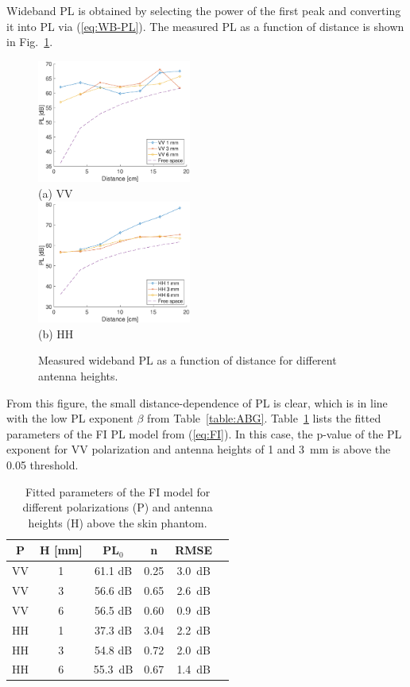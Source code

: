 \documentclass[preprint]{rsl}
\begin{document}
Wideband PL is obtained by selecting the power of the first peak and converting it into PL via (\ref{eq:WB-PL}). 
The measured PL as a function of distance is shown in Fig.~\ref{fig:PL_vs_dist}. 
\begin{figure}[tb]
\begin{center}
	\includegraphics[width=0.45\textwidth]{figures/PL_vs_dist_VV}
	\\
	(a) VV
	\\
	\includegraphics[width=0.45\textwidth]{figures/PL_vs_dist_HH}
	\\
	(b) HH
\caption{Measured wideband PL as a function of distance for different antenna heights.}
\label{fig:PL_vs_dist}
\end{center}
\end{figure}
From this figure, the small distance-dependence of PL is clear, which is in line with the low PL exponent $\beta$ from Table~\ref{table:ABG}.
Table~\ref{table:FI} lists the fitted parameters of the FI PL model from (\ref{eq:FI}).
In this case, the p-value of the PL exponent for VV polarization and antenna heights of 1 and 3~mm is above the 0.05 threshold.
\begin{table}[tb]
  \caption{Fitted parameters of the FI model for different polarizations (P) and antenna heights (H) above the skin phantom.}
  \label{table:FI}
  \begin{center}
    \begin{tabular}{cc|cccc}
      P & H [mm] & PL$_0$ & n& RMSE \\
      \hline
      VV & 1 & 61.1 dB & 0.25 & 3.0~dB \\
      VV & 3 & 56.6 dB & 0.65 & 2.6~dB \\
      VV & 6 & 56.5 dB & 0.60 & 0.9~dB \\
      HH & 1 & 37.3 dB & 3.04 & 2.2~dB \\
      HH & 3 & 54.8 dB & 0.72 & 2.0~dB \\
      HH & 6 & 55.3~dB & 0.67 & 1.4~dB \\
    \end{tabular}
  \end{center}
\end{table}
\end{document}
